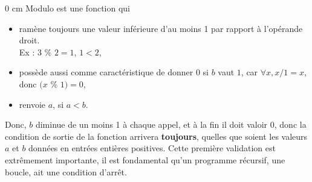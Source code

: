 { \setlength {\parindent} {0 cm}
Modulo est une fonction qui 


\begin{itemize} 
\setlength {\itemsep}{0 cm}
\item ram\`ene toujours une valeur inf\'erieure d'au moins 1
      par rapport \`a l'op\'erande droit.\\Ex : $3$ \% $2 = 1$, $1 < 2$,

\item poss\`ede aussi comme caract\'eristique de donner $0$ si $b$ vaut $1$,
      car $\forall x, x/1 = x$, donc $(x$ \% $1) = 0$,

\item renvoie $a$, si $a < b$.

\end{itemize} 
}

Donc, $b$ diminue de un moins 1 \`a chaque appel, et \`a la fin il doit valoir 0,
donc la condition de sortie de la fonction arrivera {\bf toujours}, quelles
que soient les valeurs $a$ et $b$ donn\'ees en entr\'ees enti\`eres positives. Cette
premi\`ere validation est extr\^emement importante, il est fondamental qu'un
programme r\'ecursif, une boucle, ait une condition d'arr\^et.


